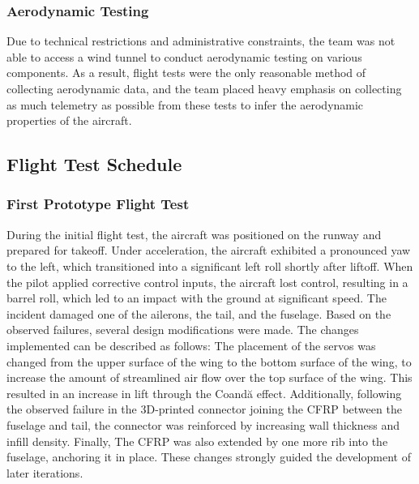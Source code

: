 \documentclass[10pt, letterpaper]{article}
\newcommand{\Filler}{}
\begin{document}
\subsubsection{Aerodynamic Testing}
Due to technical restrictions and administrative constraints, the team was not able to access a wind tunnel to conduct aerodynamic testing on various components. As a result, flight tests were the only reasonable method of collecting aerodynamic data, and the team placed heavy emphasis on collecting as much telemetry as possible from these tests to infer the aerodynamic properties of the aircraft.

\subsection{Flight Test Schedule}


\subsubsection{First Prototype Flight Test}
During the initial flight test, the aircraft was positioned on the runway and prepared for takeoff. Under acceleration, the aircraft exhibited a pronounced yaw to the left, which transitioned into a significant left roll shortly after liftoff. When the pilot applied corrective control inputs, the aircraft lost control, resulting in a barrel roll, which led to an impact with the ground at significant speed. The incident damaged one of the ailerons, the tail, and the fuselage. Based on the observed failures, several design modifications were made. The changes implemented can be described as follows: The placement of the servos was changed from the upper surface of the wing to the bottom surface of the wing, to increase the amount of streamlined air flow over the top surface of the wing. This resulted in an increase in lift through the Coandă effect. Additionally, following the observed failure in the 3D-printed connector joining the CFRP between the fuselage and tail, the connector was reinforced by increasing wall thickness and infill density. Finally, The CFRP was also extended by one more rib into the fuselage, anchoring it in place. These changes strongly guided the development of later iterations.

\Filler
\end{document}
